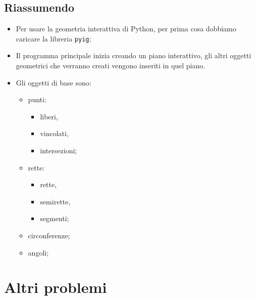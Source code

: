 \subsection{Riassumendo}
\begin{itemize} [noitemsep]
\item Per usare la geometria interattiva di Python, per prima cosa dobbiamo 
caricare la libreria \lstinline{pyig};
\item Il programma principale inizia creando un piano interattivo, gli altri 
oggetti geometrici che verranno creati vengono inseriti in quel piano.
\item Gli oggetti di base sono:
\begin{multicols}{3}
\begin{itemize} [nosep]
\item punti:
\begin{itemize} [nosep]
\item liberi,
\item vincolati,
\item intersezioni;
\end{itemize}

\item rette:
\begin{itemize} [nosep]
\item rette,
\item semirette,
\item segmenti;
\end{itemize}
\item circonferenze;
\item angoli;
\end{itemize}
\end{multicols}
\end{itemize}

\section{Altri problemi}

